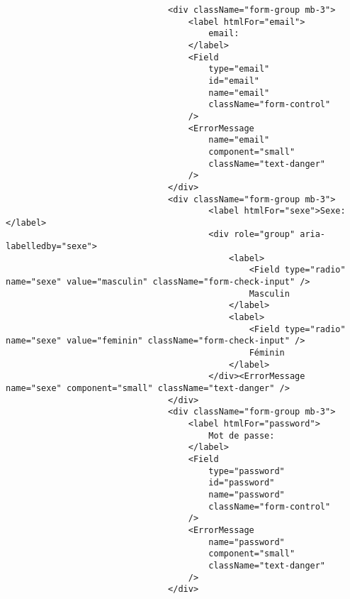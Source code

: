 \documentclass[10pt,a4paper]{article}
\begin{document}
\begin{verbatim}
                                <div className="form-group mb-3">
                                    <label htmlFor="email">
                                        email:
                                    </label>
                                    <Field
                                        type="email"
                                        id="email"
                                        name="email"
                                        className="form-control"
                                    />
                                    <ErrorMessage
                                        name="email"
                                        component="small"
                                        className="text-danger"
                                    />
                                </div>
                                <div className="form-group mb-3">
                                        <label htmlFor="sexe">Sexe:</label>
                                        <div role="group" aria-labelledby="sexe">
                                            <label>
                                                <Field type="radio" name="sexe" value="masculin" className="form-check-input" />
                                                Masculin
                                            </label>
                                            <label>
                                                <Field type="radio" name="sexe" value="feminin" className="form-check-input" />
                                                Féminin
                                            </label>
                                        </div><ErrorMessage name="sexe" component="small" className="text-danger" />
                                </div>
                                <div className="form-group mb-3">
                                    <label htmlFor="password">
                                        Mot de passe:
                                    </label>
                                    <Field
                                        type="password"
                                        id="password"
                                        name="password"
                                        className="form-control"
                                    />
                                    <ErrorMessage
                                        name="password"
                                        component="small"
                                        className="text-danger"
                                    />
                                </div>
                               

\end{verbatim}
\end{document}
